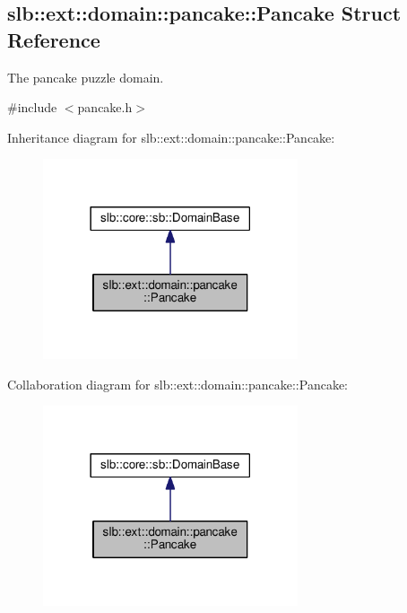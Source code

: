 \hypertarget{structslb_1_1ext_1_1domain_1_1pancake_1_1Pancake}{}\subsection{slb\+:\+:ext\+:\+:domain\+:\+:pancake\+:\+:Pancake Struct Reference}
\label{structslb_1_1ext_1_1domain_1_1pancake_1_1Pancake}


The pancake puzzle domain.  




{\ttfamily \#include $<$pancake.\+h$>$}



Inheritance diagram for slb\+:\+:ext\+:\+:domain\+:\+:pancake\+:\+:Pancake\+:\nopagebreak
\begin{figure}[H]
\begin{center}
\leavevmode
\includegraphics[width=213pt]{structslb_1_1ext_1_1domain_1_1pancake_1_1Pancake__inherit__graph}
\end{center}
\end{figure}


Collaboration diagram for slb\+:\+:ext\+:\+:domain\+:\+:pancake\+:\+:Pancake\+:\nopagebreak
\begin{figure}[H]
\begin{center}
\leavevmode
\includegraphics[width=213pt]{structslb_1_1ext_1_1domain_1_1pancake_1_1Pancake__coll__graph}
\end{center}
\end{figure}
